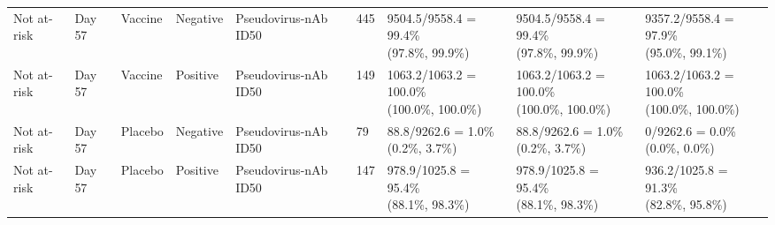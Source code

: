 \documentclass[]{book}
\theoremstyle{definition}
\theoremstyle{definition}
\theoremstyle{definition}
\newcommand{\1}{\mathbbm{1}}
\begin{document}
\begin{landscape}
\begin{ThreePartTable}
\begin{longtable}[t]{>{\raggedright\arraybackslash}p{2.7cm}llllllll}
\hspace{1em}Not at-risk & Day 57 & Vaccine & Negative & Pseudovirus-nAb ID50 & 445 & \makecell[l]{9504.5/9558.4 = 99.4\%\\(97.8\%, 99.9\%)} & \makecell[l]{9504.5/9558.4 = 99.4\%\\(97.8\%, 99.9\%)} & \makecell[l]{9357.2/9558.4 = 97.9\%\\(95.0\%, 99.1\%)}\\
\hspace{1em}Not at-risk & Day 57 & Vaccine & Positive & Pseudovirus-nAb ID50 & 149 & \makecell[l]{1063.2/1063.2 = 100.0\%\\(100.0\%, 100.0\%)} & \makecell[l]{1063.2/1063.2 = 100.0\%\\(100.0\%, 100.0\%)} & \makecell[l]{1063.2/1063.2 = 100.0\%\\(100.0\%, 100.0\%)}\\
\hspace{1em}Not at-risk & Day 57 & Placebo & Negative & Pseudovirus-nAb ID50 & 79 & \makecell[l]{88.8/9262.6 = 1.0\%\\(0.2\%, 3.7\%)} & \makecell[l]{88.8/9262.6 = 1.0\%\\(0.2\%, 3.7\%)} & \makecell[l]{0/9262.6 = 0.0\%\\(0.0\%, 0.0\%)}\\
\hspace{1em}Not at-risk & Day 57 & Placebo & Positive & Pseudovirus-nAb ID50 & 147 & \makecell[l]{978.9/1025.8 = 95.4\%\\(88.1\%, 98.3\%)} & \makecell[l]{978.9/1025.8 = 95.4\%\\(88.1\%, 98.3\%)} & \makecell[l]{936.2/1025.8 = 91.3\%\\(82.8\%, 95.8\%)}\\*
\end{longtable}
\end{ThreePartTable}


\clearpage


\end{landscape}
\end{document}
